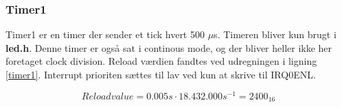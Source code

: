 \subsubsection{Timer1}
Timer1 er en timer der sender et tick hvert 500 $\mu$s. Timeren bliver kun brugt i \textbf{led.h}. Denne timer er også sat i continous mode, og der bliver heller ikke her foretaget clock division. Reload værdien fandtes ved udregningen i ligning \ref{timer1}. Interrupt prioriten sættes til lav ved kun at skrive til IRQ0ENL.

\begin{equation}
\label{timer1}
Reloadvalue  = 0.005 \si{s} \cdot 18.432.000 \si{s^{-1}} = 2400_{16}  
\end{equation}